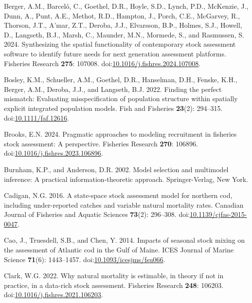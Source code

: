 \documentclass[
]{article}
\newlength{\cslhangindent}
\newlength{\cslentryspacingunit} %
\newenvironment{CSLReferences}[2] %
 {%
  \setlength{\parindent}{0pt}
  \ifodd #1
  \let\oldpar\par
  \def\par{\hangindent=\cslhangindent\oldpar}
  \fi
  \setlength{\parskip}{#2\cslentryspacingunit}
 }%
 {}
\begin{document}
\begin{CSLReferences}{1}{0}
\leavevmode{}%
Berger, A.M., Barceló, C., Goethel, D.R., Hoyle, S.D., Lynch, P.D., McKenzie, J., Dunn, A., Punt, A.E., Methot, R.D., Hampton, J., Porch, C.E., McGarvey, R., Thorson, J.T., A'mar, Z.T., Deroba, J.J., Elvarsson, B.Þ., Holmes, S.J., Howell, D., Langseth, B.J., Marsh, C., Maunder, M.N., Mormede, S., and Rasmussen, S. 2024. Synthesizing the spatial functionality of contemporary stock assessment software to identify future needs for next generation assessment platforms. Fisheries Research \textbf{275}: 107008. doi:\href{https://doi.org/10.1016/j.fishres.2024.107008}{10.1016/j.fishres.2024.107008}.

\leavevmode{}%
Bosley, K.M., Schueller, A.M., Goethel, D.R., Hanselman, D.H., Fenske, K.H., Berger, A.M., Deroba, J.J., and Langseth, B.J. 2022. Finding the perfect mismatch: Evaluating misspecification of population structure within spatially explicit integrated population models. Fish and Fisheries \textbf{23}(2): 294--315. doi:\href{https://doi.org/10.1111/faf.12616}{10.1111/faf.12616}.

\leavevmode{}%
Brooks, E.N. 2024. Pragmatic approaches to modeling recruitment in fisheries stock assessment: A perspective. Fisheries Research \textbf{270}: 106896. doi:\href{https://doi.org/10.1016/j.fishres.2023.106896}{10.1016/j.fishres.2023.106896}.

\leavevmode{}%
Burnham, K.P., and Anderson, D.R. 2002. Model selection and multimodel inference: A practical information-theoretic approach. Springer-Verlag, New York.

\leavevmode{}%
Cadigan, N.G. 2016. A state-space stock assessment model for northern cod, including under-reported catches and variable natural mortality rates. Canadian Journal of Fisheries and Aquatic Sciences \textbf{73}(2): 296--308. doi:\href{https://doi.org/10.1139/cjfas-2015-0047}{10.1139/cjfas-2015-0047}.

\leavevmode{}%
Cao, J., Truesdell, S.B., and Chen, Y. 2014. Impacts of seasonal stock mixing on the assessment of {A}tlantic cod in the {G}ulf of {M}aine. ICES Journal of Marine Science \textbf{71}(6): 1443--1457. doi:\href{https://doi.org/10.1093/icesjms/fsu066}{10.1093/icesjms/fsu066}.

\leavevmode{}%
Clark, W.G. 2022. Why natural mortality is estimable, in theory if not in practice, in a data-rich stock assessment. Fisheries Research \textbf{248}: 106203. doi:\href{https://doi.org/10.1016/j.fishres.2021.106203}{10.1016/j.fishres.2021.106203}.


\end{CSLReferences}
\end{document}
